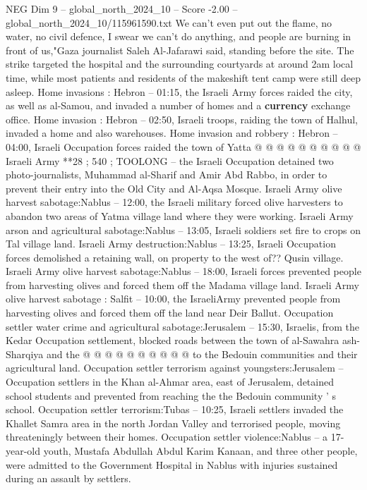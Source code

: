 \begin{textsample}{NEG Dim 9 – global\_north\_2024\_10 – Score -2.00 – global\_north\_2024\_10/115961590.txt}
We can't even put out the flame, no water, no civil defence, I swear we can't do anything, and people are burning in front of us,"Gaza journalist Saleh Al-Jafarawi said, standing before the site.
The strike targeted the hospital and the surrounding courtyards at around 2am local time, while most patients and residents of the makeshift tent camp were still deep asleep.
Home invasions : Hebron -- 01:15, the Israeli Army forces raided the city, as well as al-Samou, and invaded a number of homes and a \textbf{currency} exchange office.
Home invasion : Hebron -- 02:50, Israeli troops, raiding the town of Halhul, invaded a home and also warehouses.
Home invasion and robbery : Hebron -- 04:00, Israeli Occupation forces raided the town of Yatta @ @ @ @ @ @ @ @ @ @ Israeli Army **28 ; 540 ; TOOLONG -- the Israeli Occupation detained two photo-journalists, Muhammad al-Sharif and Amir Abd Rabbo, in order to prevent their entry into the Old City and Al-Aqsa Mosque.
Israeli Army olive harvest sabotage:Nablus -- 12:00, the Israeli military forced olive harvesters to abandon two areas of Yatma village land where they were working.
Israeli Army arson and agricultural sabotage:Nablus -- 13:05, Israeli soldiers set fire to crops on Tal village land.
Israeli Army destruction:Nablus -- 13:25, Israeli Occupation forces demolished a retaining wall, on property to the west of??
Qusin village.
Israeli Army olive harvest sabotage:Nablus -- 18:00, Israeli forces prevented people from harvesting olives and forced them off the Madama village land.
Israeli Army olive harvest sabotage : Salfit -- 10:00, the IsraeliArmy prevented people from harvesting olives and forced them off the land near Deir Ballut.
Occupation settler water crime and agricultural sabotage:Jerusalem -- 15:30, Israelis, from the Kedar Occupation settlement, blocked roads between the town of al-Sawahra ash-Sharqiya and the @ @ @ @ @ @ @ @ @ @ to the Bedouin communities and their agricultural land.
Occupation settler terrorism against youngsters:Jerusalem -- Occupation settlers in the Khan al-Ahmar area, east of Jerusalem, detained school students and prevented from reaching the the Bedouin community ' s school.
Occupation settler terrorism:Tubas -- 10:25, Israeli settlers invaded the Khallet Samra area in the north Jordan Valley and terrorised people, moving threateningly between their homes.
Occupation settler violence:Nablus -- a 17-year-old youth, Mustafa Abdullah Abdul Karim Kanaan, and three other people, were admitted to the Government Hospital in Nablus with injuries sustained during an assault by settlers.

\end{textsample}
